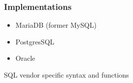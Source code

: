 \begin{frame}[fragile]
        \frametitle{Implementations}

\begin{itemize}
   \item MariaDB (former MySQL)
   \item PostgresSQL
   \item Oracle
\end{itemize}

SQL vendor specific syntax and functions

\end{frame}

